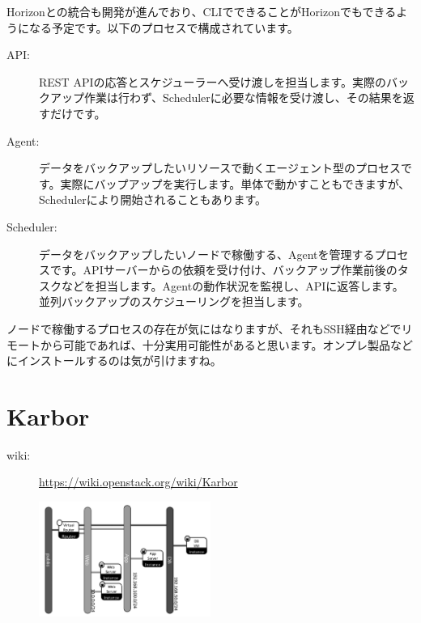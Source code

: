 Horizonとの統合も開発が進んでおり、CLIでできることがHorizonでもできるようになる予定です。以下のプロセスで構成されています。

\begin{description}
	\item[API:] REST APIの応答とスケジューラーへ受け渡しを担当します。実際のバックアップ作業は行わず、Schedulerに必要な情報を受け渡し、その結果を返すだけです。
	\item[Agent:] データをバックアップしたいリソースで動くエージェント型のプロセスです。実際にバップアップを実行します。単体で動かすこともできますが、Schedulerにより開始されることもあります。
	\item[Scheduler:] データをバックアップしたいノードで稼働する、Agentを管理するプロセスです。APIサーバーからの依頼を受け付け、バックアップ作業前後のタスクなどを担当します。Agentの動作状況を監視し、APIに返答します。並列バックアップのスケジューリングを担当します。
\end{description}

ノードで稼働するプロセスの存在が気にはなりますが、それもSSH経由などでリモートから可能であれば、十分実用可能性があると思います。オンプレ製品などにインストールするのは気が引けますね。

\section{Karbor}

\begin{description}
	\item[wiki:] \url{https://wiki.openstack.org/wiki/Karbor}
\end{description}

\begin{figure}
	\vspace*{-2\intextsep}
	\begin{center}
		\includegraphics[width=0.5\textwidth]{img/Smaug-sample-application.png}
	\end{center}
\end{figure}

